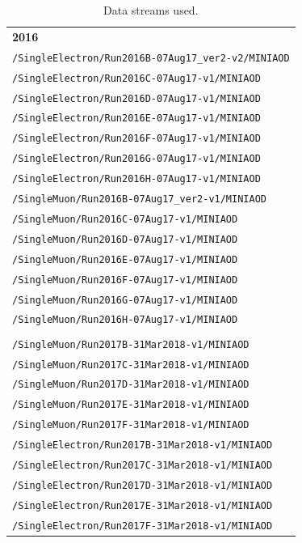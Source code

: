 \begin{table}[tp]
\centering
\caption{Data streams used.}
\label{tab:DATA}
\begin{tabular}{| l |}\hline
{\bf 2016} \\ 
\tiny {\tt /SingleElectron/Run2016B-07Aug17\_ver2-v2/MINIAOD} \\
\tiny {\tt /SingleElectron/Run2016C-07Aug17-v1/MINIAOD} \\
\tiny {\tt /SingleElectron/Run2016D-07Aug17-v1/MINIAOD} \\
\tiny {\tt /SingleElectron/Run2016E-07Aug17-v1/MINIAOD} \\
\tiny {\tt /SingleElectron/Run2016F-07Aug17-v1/MINIAOD} \\
\tiny {\tt /SingleElectron/Run2016G-07Aug17-v1/MINIAOD} \\
\tiny {\tt /SingleElectron/Run2016H-07Aug17-v1/MINIAOD} \\
\tiny {\tt /SingleMuon/Run2016B-07Aug17\_ver2-v1/MINIAOD} \\
\tiny {\tt /SingleMuon/Run2016C-07Aug17-v1/MINIAOD} \\
\tiny {\tt /SingleMuon/Run2016D-07Aug17-v1/MINIAOD} \\
\tiny {\tt /SingleMuon/Run2016E-07Aug17-v1/MINIAOD} \\
\tiny {\tt /SingleMuon/Run2016F-07Aug17-v1/MINIAOD} \\
\tiny {\tt /SingleMuon/Run2016G-07Aug17-v1/MINIAOD} \\
\tiny {\tt /SingleMuon/Run2016H-07Aug17-v1/MINIAOD} \\\hline
{\bf \centering 2017} \\
\tiny {\tt /SingleMuon/Run2017B-31Mar2018-v1/MINIAOD} \\
\tiny {\tt /SingleMuon/Run2017C-31Mar2018-v1/MINIAOD} \\
\tiny {\tt /SingleMuon/Run2017D-31Mar2018-v1/MINIAOD} \\
\tiny {\tt /SingleMuon/Run2017E-31Mar2018-v1/MINIAOD} \\
\tiny {\tt /SingleMuon/Run2017F-31Mar2018-v1/MINIAOD} \\
\tiny {\tt /SingleElectron/Run2017B-31Mar2018-v1/MINIAOD} \\
\tiny {\tt /SingleElectron/Run2017C-31Mar2018-v1/MINIAOD} \\
\tiny {\tt /SingleElectron/Run2017D-31Mar2018-v1/MINIAOD} \\
\tiny {\tt /SingleElectron/Run2017E-31Mar2018-v1/MINIAOD} \\
\tiny {\tt /SingleElectron/Run2017F-31Mar2018-v1/MINIAOD} \\\hline

\end{tabular}
\end{table}
